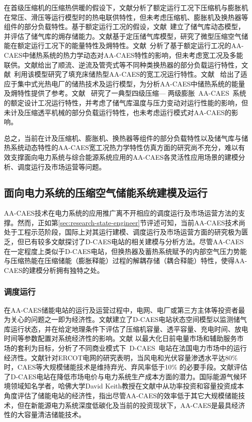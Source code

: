 在首级压缩机的压缩热供暖的假设下，文献分析了额定运行工况下压缩机与膨胀机在常压、滑压等运行模型时的热电联供特性，但未考虑压缩机、膨胀机及换热器等组件的部分负载特性。基于额定运行工况的假设，文献~建立了储气库动态模型，并评估了储气库的㶲存储能力。文献基于定压储气库模型，研究了微型压缩空气储能在额定运行工况下的能量特性及㶲特性。文献~分析了基于额定运行工况的AA-CAES中储热系统的热力学动态对AA-CAES特性的影响，但未考虑宽工况及多能联供。文献给出了顺流、逆流及管壳式等不同种类换热器的部分负载运行特性，文献~利用该模型研究了填充床储热型AA-CAES的宽工况运行特性。文献~ 给出了适应于集中式光热电厂的储热技术及运行模型，为分析AA-CAES中储热系统的能量及㶲特性提供了参考。文献~ 研究了一典型四级压缩— 两级膨胀~AA-CAES~系统的额定设计工况运行特性，并考虑了储气库温度与压力变动对运行性能的影响，但未计及压缩透平机械的部分负载运行特性，也未考虑运行模式对AA-CAES的影响。

总之，当前在计及压缩机、膨胀机、换热器等组件的部分负载特性以及储气库与储热系统动态特性的AA-CAES宽工况热力学特性仿真方面的研究尚不充分，难以有效支撑面向电力系统与综合能源系统应用的AA-CAES各灵活性应用场景的建模分析、调度运行及市场运营等问题。

\subsection{面向电力系统的压缩空气储能系统建模及运行}
AA-CAES技术在电力系统的应用推广离不开相应的调度运行及市场运营方法的支撑。然而，正如第\ref{sec:research-state-engineer}节评述可知，当前AA-CAES技术尚处于工程示范阶段，国际上对其运行建模、调度运行及市场运营方面的研究极为匮乏，但已有较多文献探讨了D-CAES电站的相关建模与分析方法。尽管AA-CAES在一定程度上类似于D-CAES电站，但换热器及蓄热系统赋予的内部空气压力势能与压缩热能在压缩储能（膨胀释能）过程的解耦存储（耦合释能）特性，使得AA-CAES的建模分析拥有独特之处。

\subsubsection{调度运行}
在AA-CAES储能电站的运行及运营过程中，电网、电厂或第三方主体等投资者最为关心的问题之一即为经济性。文献建立了D-CAES电站状态空间模型以监测储气库运行状态，并在给定地理条件下评估了压缩机容量、透平容量、充电时间、放电时间等参数配置对系统经济性的影响。文献 以最大化日前电量市场和辅助服务市场的套利为目标，分析了不同商业模式下~D-CAES~电站在法国电力市场中的运行经济性。文献针对ERCOT电网的研究表明，当风电和光伏容量渗透水平达80\% 时，CAES等大规模储能技术是维持弃光、弃风率低于10\% 的必要手段。文献评估了D-CAES电站在降低市场电价与电力系统生产成本方面的潜力。国际能源气候环境领域知名学者，哈佛大学David Keith教授在文献中从功率投资和容量投资成本角度评估了储能电站的经济性，指出尽管AA-CAES的效率低于其它大规模储能技术，但在新能源电力系统深度低碳化及当前的投资现状下，AA-CAES是最具经济性的大容量清洁储能技术。

